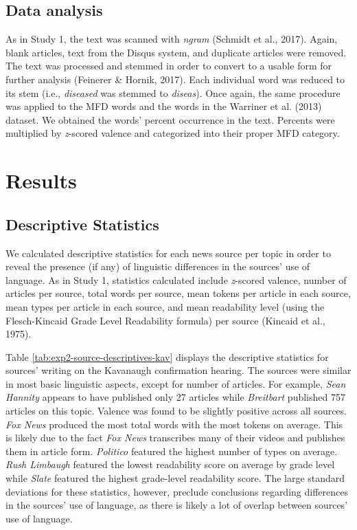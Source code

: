 \documentclass[
  man,floatsintext]{apa6}
\begin{document}
\hypertarget{data-analysis-1}{%
\subsection{Data analysis}\label{data-analysis-1}}

As in Study 1, the text was scanned with \emph{ngram} (Schmidt et al., 2017). Again, blank articles, text from the Disqus system, and duplicate articles were removed. The text was processed and stemmed in order to convert to a usable form for further analysis (Feinerer \& Hornik, 2017). Each individual word was reduced to its stem (i.e., \emph{diseased} was stemmed to \emph{diseas}). Once again, the same procedure was applied to the MFD words and the words in the Warriner et al. (2013) dataset. We obtained the words' percent occurrence in the text. Percents were multiplied by \emph{z}-scored valence and categorized into their proper MFD category.

\hypertarget{results-1}{%
\section{Results}\label{results-1}}

\hypertarget{descriptive-statistics-1}{%
\subsection{Descriptive Statistics}\label{descriptive-statistics-1}}

We calculated descriptive statistics for each news source per topic in order to reveal the presence (if any) of linguistic differences in the sources' use of language. As in Study 1, statistics calculated include \emph{z}-scored valence, number of articles per source, total words per source, mean tokens per article in each source, mean types per article in each source, and mean readability level (using the Flesch-Kincaid Grade Level Readability formula) per source (Kincaid et al., 1975).

Table \ref{tab:exp2-source-descriptives-kav} displays the descriptive statistics for sources' writing on the Kavanaugh confirmation hearing. The sources were similar in most basic linguistic aspects, except for number of articles. For example, \emph{Sean Hannity} appears to have published only 27 articles while \emph{Breitbart} published 757 articles on this topic. Valence was found to be slightly positive across all sources. \emph{Fox News} produced the most total words with the most tokens on average. This is likely due to the fact \emph{Fox News} transcribes many of their videos and publishes them in article form. \emph{Politico} featured the highest number of types on average. \emph{Rush Limbaugh} featured the lowest readability score on average by grade level while \emph{Slate} featured the highest grade-level readability score. The large standard deviations for these statistics, however, preclude conclusions regarding differences in the sources' use of language, as there is likely a lot of overlap between sources' use of language.
\end{document}
